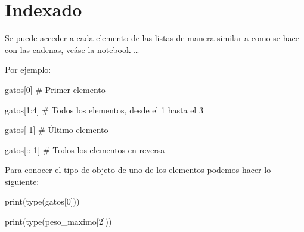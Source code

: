 \documentclass[
  letterpaper,
  DIV=11,
  numbers=noendperiod]{scrreprt}
\newenvironment{Shaded}{\begin{snugshade}}{\end{snugshade}}
\newcommand{\BuiltInTok}[1]{\textcolor[rgb]{0.00,0.23,0.31}{#1}}
\newcommand{\CommentTok}[1]{\textcolor[rgb]{0.37,0.37,0.37}{#1}}
\newcommand{\DecValTok}[1]{\textcolor[rgb]{0.68,0.00,0.00}{#1}}
\newcommand{\NormalTok}[1]{\textcolor[rgb]{0.00,0.23,0.31}{#1}}
\newcommand{\OperatorTok}[1]{\textcolor[rgb]{0.37,0.37,0.37}{#1}}
\begin{document}
\section{Indexado}\label{indexado}

Se puede acceder a cada elemento de las listas de manera similar a como
se hace con las cadenas, veáse la notebook \ldots{}

Por ejemplo:

\begin{Shaded}
\begin{Highlighting}[]
\NormalTok{gatos[}\DecValTok{0}\NormalTok{] }\CommentTok{\# Primer elemento}
\end{Highlighting}
\end{Shaded}

\begin{Shaded}
\begin{Highlighting}[]
\NormalTok{gatos[}\DecValTok{1}\NormalTok{:}\DecValTok{4}\NormalTok{] }\CommentTok{\# Todos los elementos, desde el 1 hasta el 3}
\end{Highlighting}
\end{Shaded}

\begin{Shaded}
\begin{Highlighting}[]
\NormalTok{gatos[}\OperatorTok{{-}}\DecValTok{1}\NormalTok{] }\CommentTok{\# Último elemento}
\end{Highlighting}
\end{Shaded}

\begin{Shaded}
\begin{Highlighting}[]
\NormalTok{gatos[::}\OperatorTok{{-}}\DecValTok{1}\NormalTok{] }\CommentTok{\# Todos los elementos en reversa}
\end{Highlighting}
\end{Shaded}

Para conocer el tipo de objeto de uno de los elementos podemos hacer lo
siguiente:

\begin{Shaded}
\begin{Highlighting}[]
\BuiltInTok{print}\NormalTok{(}\BuiltInTok{type}\NormalTok{(gatos[}\DecValTok{0}\NormalTok{]))}
\end{Highlighting}
\end{Shaded}

\begin{Shaded}
\begin{Highlighting}[]
\BuiltInTok{print}\NormalTok{(}\BuiltInTok{type}\NormalTok{(peso\_maximo[}\DecValTok{2}\NormalTok{]))}
\end{Highlighting}
\end{Shaded}
\end{document}
